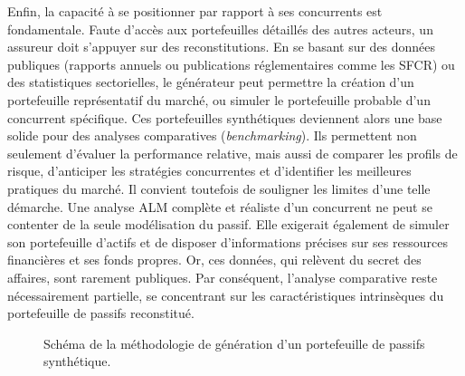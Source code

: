 Enfin, la capacité à se positionner par rapport à ses concurrents est fondamentale. Faute d'accès aux portefeuilles détaillés des autres acteurs, un assureur doit s'appuyer sur des reconstitutions. En se basant sur des données publiques (rapports annuels ou publications réglementaires comme les SFCR) ou des statistiques sectorielles, le générateur peut permettre la création d'un portefeuille représentatif du marché, ou simuler le portefeuille probable d'un concurrent spécifique. Ces portefeuilles synthétiques deviennent alors une base solide pour des analyses comparatives (\textit{benchmarking}). Ils permettent non seulement d'évaluer la performance relative, mais aussi de comparer les profils de risque, d'anticiper les stratégies concurrentes et d'identifier les meilleures pratiques du marché. Il convient toutefois de souligner les limites d'une telle démarche. Une analyse ALM complète et réaliste d'un concurrent ne peut se contenter de la seule modélisation du passif. Elle exigerait également de simuler son portefeuille d'actifs et de disposer d'informations précises sur ses ressources financières et ses fonds propres. Or, ces données, qui relèvent du secret des affaires, sont rarement publiques. Par conséquent, l'analyse comparative reste nécessairement partielle, se concentrant sur les caractéristiques intrinsèques du portefeuille de passifs reconstitué.
\bigskip

\begin{figure}[h!]
    \centering
    \caption{Schéma de la méthodologie de génération d'un portefeuille de passifs synthétique.}
    \label{fig:methodologie_horizontale}
\end{figure}

